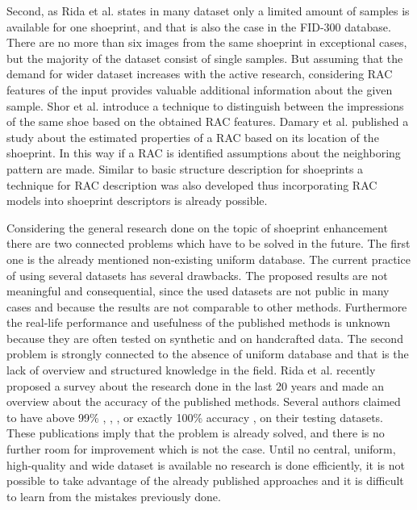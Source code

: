 \documentclass[draft,final]{vutinfth} %
\begin{document}
Second, as Rida et al. \cite{rida2019forensic} states in many dataset only a limited amount of samples is available for one shoeprint, and that is also the case in the FID-300 database.
There are no more than six images from the same shoeprint in exceptional cases, but the majority of the dataset consist of single samples.
But assuming that the demand for wider dataset increases with the active research, considering RAC features of the input provides valuable additional information about the given sample.
Shor et al. \cite{shor2018inherent} introduce a technique to distinguish between the impressions of the same shoe based on the obtained RAC features.
Damary et al. \cite{damary2018dependence} published a study about the estimated properties of a RAC based on its location of the shoeprint.
In this way if a RAC is identified assumptions about the neighboring pattern are made.
Similar to basic structure description for shoeprints \cite{tang2010footwear} a technique for RAC description was also developed \cite{speir2016quantifying} thus incorporating RAC models into shoeprint descriptors is already possible.
\par
Considering the general research done on the topic of shoeprint enhancement there are two connected problems which have to be solved in the future.
The first one is the already mentioned non-existing uniform database.
The current practice of using several datasets has several drawbacks.
The proposed results are not meaningful and consequential, since the used datasets are not public in many cases and because the results are not comparable to other methods.
Furthermore the real-life performance and usefulness of the published methods is unknown because they are often tested on synthetic and on handcrafted data.
The second problem is strongly connected to the absence of uniform database and that is the lack of overview and structured knowledge in the field.
Rida et al. \cite{rida2019forensic} recently proposed a survey about the research done in the last 20 years and made an overview about the accuracy of the published methods.
Several authors claimed to have above 99\% \cite{algarni2008novel}, \cite{alizadeh2017automatic}, \cite{almaadeed2015partial}, or exactly 100\% accuracy \cite{graham2007automatic}, on their testing datasets.
These publications imply that the problem is already solved, and there is no further room for improvement which is not the case.
Until no central, uniform, high-quality and wide dataset is available no research is done efficiently, it is not possible to take advantage of the already published approaches and it is difficult to learn from the mistakes previously done.
\end{document}
